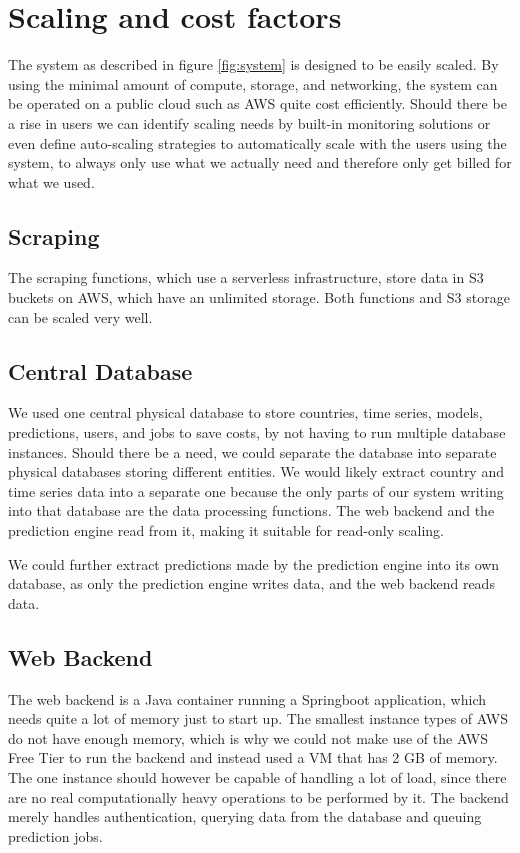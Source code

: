 
\section{Scaling and cost factors}

The system as described in figure \ref{fig:system} is designed to be easily scaled. By using the minimal amount of compute, storage, and networking, the system can be operated on a public cloud such as AWS quite cost efficiently. Should there be a rise in users we can identify scaling needs by built-in monitoring solutions or even define auto-scaling strategies to automatically scale with the users using the system, to always only use what we actually need and therefore only get billed for what we used. 

\subsection{Scraping}
The scraping functions, which use a serverless infrastructure, store data in S3 buckets on AWS, which have an unlimited storage. Both functions and S3 storage can be scaled very well.

\subsection{Central Database}
We used one central physical database to store countries, time series, models, predictions, users, and jobs to save costs, by not having to run multiple database instances. Should there be a need, we could separate the database into separate physical databases storing different entities. We would likely extract country and time series data into a separate one because the only parts of our system writing into that database are the data processing functions. The web backend and the prediction engine read from it, making it suitable for read-only scaling.

We could further extract predictions made by the prediction engine into its own database, as only the prediction engine writes data, and the web backend reads data.

\subsection{Web Backend}
The web backend is a Java container running a Springboot application, which needs quite a lot of memory just to start up. The smallest instance types of AWS do not have enough memory, which is why we could not make use of the AWS Free Tier to run the backend and instead used a VM that has 2 GB of memory. The one instance should however be capable of handling a lot of load, since there are no real computationally heavy operations to be performed by it. The backend merely handles authentication, querying data from the database and queuing prediction jobs.

